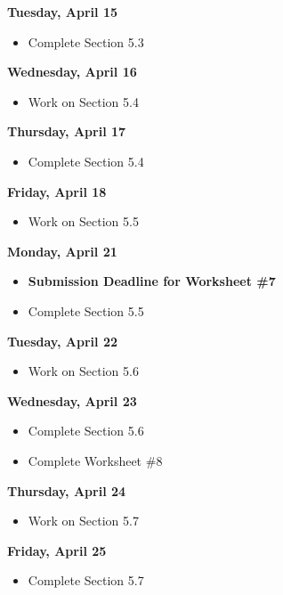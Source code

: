 \documentclass[11pt]{article}
\begin{document}
\textbf{Tuesday, April 15}

\begin{itemize}
\item Complete Section 5.3
\end{itemize}

\textbf{Wednesday, April 16}

\begin{itemize}
\item Work on Section 5.4
\end{itemize}

\textbf{Thursday, April 17}

\begin{itemize}
\item Complete Section 5.4
\end{itemize}

\textbf{Friday, April 18}

\begin{itemize}
\item Work on Section 5.5
\end{itemize}

\textbf{Monday, April 21}

\begin{itemize}
\item \textbf{Submission Deadline for Worksheet \#7}
\item Complete Section 5.5
\end{itemize}

\textbf{Tuesday, April 22}

\begin{itemize}
\item Work on Section 5.6
\end{itemize}

\textbf{Wednesday, April 23}

\begin{itemize}
\item Complete Section 5.6
\item Complete Worksheet \#8
\end{itemize}

\textbf{Thursday, April 24}

\begin{itemize}
\item Work on Section 5.7
\end{itemize}

\textbf{Friday, April 25}

\begin{itemize}
\item Complete Section 5.7
\end{itemize}
\end{document}
